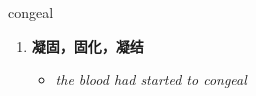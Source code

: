 
\begin{frame}
{\huge congeal}
\begin{center}
\begin{enumerate}\Large
  \item \textbf{凝固，固化，凝结}
  \begin{itemize}
    \item \em{\Large{the blood had started to congeal}}
  \end{itemize}
\end{enumerate}
\end{center}
\end{frame}
